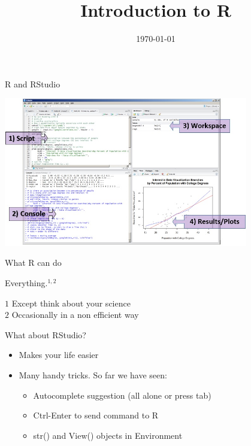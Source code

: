 \documentclass[10pt]{beamer}\usepackage[]{graphicx}\usepackage[]{color}
\title[\textbf{Intro to R}]{Introduction to R}
\date{\today}
\begin{document}
\begin{frame}
\maketitle	
\end{frame}

\begin{frame}{R and RStudio}
  \begin{center}
    \includegraphics[width=0.8\textwidth]{Figures/rstudiolayout}
  \end{center}
\end{frame}

\begin{frame}{What R can do}

  \pause \begin{exampleblock}{Everything.$^{1,2}$}
    
  {\tiny $1$ Except think about your science}\\
  {\tiny $2$ Occasionally in a non efficient way}
  \end{exampleblock}
  
  \pause \begin{block}{What about RStudio?}
  \begin{itemize}
    \item Makes your life easier
    \item Many handy tricks. So far we have seen:
      \begin{itemize}
      \item Autocomplete suggestion (all alone or press tab)
      \item Ctrl-Enter to send command to R
      \item str() and View() objects in Environment
      \end{itemize}
    \end{itemize}
  \end{block}
\end{frame}
\end{document}
